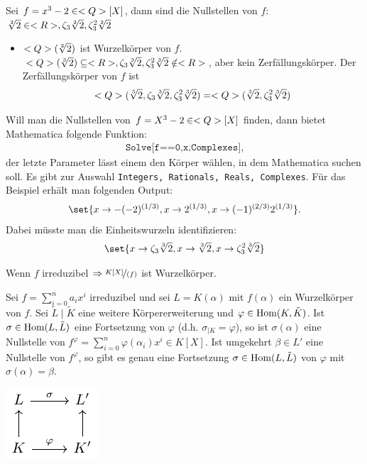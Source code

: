 \begin{*example}
	Sei $f = x^3 -2 \in <Q>[X]$, dann sind die Nullstellen von $f$: $\sqrt[2]{2} \in <R>, \zeta_3\sqrt[2]{2}, \zeta_3^2 \sqrt[2]{2}$
	\begin{itemize}
		\item $<Q>(\sqrt[2]{2})$ ist Wurzelkörper von $f$. $<Q>(\sqrt[3]{2}) \subseteq <R>, \zeta_3\sqrt[3]{2}, \zeta_3^2 \sqrt[3]{2} \notin <R>$, aber kein Zerfällungskörper. Der Zerfällungskörper von $f$ ist
		\begin{align*}
			<Q>(\sqrt[3]{2},\zeta_3\sqrt[3]{2}, \zeta_3^2 \sqrt[3]{2}) = <Q>(\sqrt[3]{2}, \zeta_3^2 \sqrt[3]{2})
		\end{align*}
	\end{itemize}
\end{*example}
\begin{mathematica}
	Will man die Nullstellen von $f = X^3 - 2 \in <Q>[X]$ finden, dann bietet Mathematica folgende Funktion:
	\begin{align*}
		\texttt{Solve[f==0,x,Complexes]},
	\end{align*}
	der letzte Parameter lässt einem den Körper wählen, in dem Mathematica suchen soll. Es gibt zur Auswahl \texttt{Integers, Rationals, Reals, Complexes}. Für das Beispiel erhält man folgenden Output:
	\begin{align*}
		\set{x \to -(-2)^{(1/3)}, x \to 2^{(1/3)}, x \to (-1)^{(2/3)} 2^{(1/3)}}.
	\end{align*}
	Dabei müsste man die Einheitswurzeln identifizieren:
	\begin{align*}
		\set{x \to \zeta_3\sqrt[3]{2}, x \to \sqrt[3]{2}, x \to \zeta_3^2 \sqrt[3]{2}}
	\end{align*}
\end{mathematica}
\begin{*anmerkung}
	Wenn $f$ irreduzibel $\Rightarrow \lnkset{K[X]}{(f)}$ ist Wurzelkörper.
\end{*anmerkung}
\begin{lemma}
	Sei $f = \sum_{i=0}^n a_i x^i$ irreduzibel und sei $L = K(\alpha)$ mit $f(\alpha)$ ein Wurzelkörper von $f$. Sei $\tilde{L}\mid \tilde{K}$ eine weitere Körpererweiterung und $\varphi \in \operatorname{Hom}(K,\tilde{K})$. Ist $\sigma \in \operatorname{Hom}(L,\tilde{L})$ eine Fortsetzung von $\varphi$ (d.h. $\sigma_{\mid K} = \varphi$), so ist $\sigma(\alpha)$ eine Nullstelle von $f^{\varphi}=\sum_{i=0}^n \varphi(\alpha_i)x^i \in K[X]$. Ist umgekehrt $\beta \in L' $ eine Nullstelle von $f^{\varphi}$, so gibt es genau eine Fortsetzung $\sigma \in \operatorname{Hom}(L,\tilde{L})$ von $\varphi$ mit $\sigma(\alpha) = \beta$.
\begin{center} %
	\includegraphics{./tikz/lemma_1_3_12.pdf}
\end{center}
\end{lemma}
